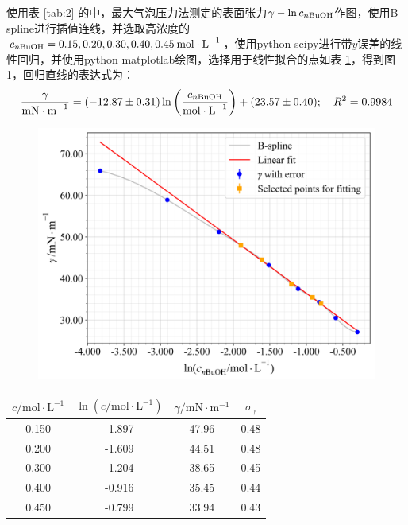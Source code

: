使用表 \ref{tab:2} 的中，最大气泡压力法测定的表面张力$\gamma-\ln c_{n\ce{BuOH}}$作图，使用B-spline进行插值连线，并选取高浓度的$c_{n\ce{BuOH}}=0.15, 0.20, 0.30, 0.40, 0.45\:\si{mol\cdot L^{-1}}$，使用python scipy进行带$y$误差的线性回归，并使用python matplotlab绘图，选择用于线性拟合的点如表 \ref{tab:4}，得到图 \ref{fig:1}，回归直线的表达式为：
\begin{equation*}
    \frac{\gamma}{\si{mN\cdot m^{-1}}} = (-12.87 \pm 0.31)\ln\left(\frac{ c_{n\ce{BuOH}}}{\si{mol\cdot L^{-1}}}\right) + (23.57 \pm 0.40);\quad R^2 = 0.9984
\end{equation*}

\begin{figure}[htbp]
    \centering
    \includegraphics[width=.8\textwidth]{figures/1-1.png}
    \label{fig:1}
\end{figure}

\begin{table}[htbp]
    \centering
    \begin{tabular}{cccc}
    \toprule
    $c / \mathrm{mol} \cdot \mathrm{L}^{-1}$ & $\ln \left(c / \mathrm{mol} \cdot \mathrm{L}^{-1}\right)$ & $\gamma / \mathrm{mN} \cdot \mathrm{m}^{-1}$ & $\sigma_\gamma$ \\
    \midrule
    0.150 & -1.897 & 47.96 & 0.48 \\
    0.200 & -1.609 & 44.51 & 0.48 \\
    0.300 & -1.204 & 38.65 & 0.45 \\
    0.400 & -0.916 & 35.45 & 0.44 \\
    0.450 & -0.799 & 33.94 & 0.43 \\
    \bottomrule
    \end{tabular}
    \label{tab:4}
\end{table}

